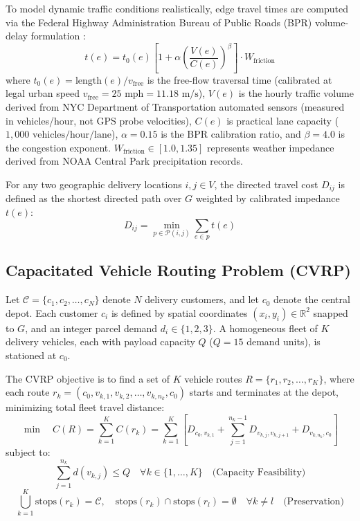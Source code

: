 \documentclass[journal,10pt]{IEEEtran}
\begin{document}
To model dynamic traffic conditions realistically, edge travel times are computed via the Federal Highway Administration Bureau of Public Roads (BPR) volume-delay formulation \cite{bpr1964traffic}:
\begin{equation}
\label{eq:bpr}
t(e) = t_0(e) \left[ 1 + \alpha \left(\frac{V(e)}{C(e)}\right)^\beta \right] \cdot W_{\text{friction}}
\end{equation}
where $t_0(e) = \text{length}(e) / v_{\text{free}}$ is the free-flow traversal time (calibrated at legal urban speed $v_{\text{free}} = 25\text{ mph} = 11.18\text{ m/s}$), $V(e)$ is the hourly traffic volume derived from NYC Department of Transportation automated sensors (measured in vehicles/hour, not GPS probe velocities), $C(e)$ is practical lane capacity ($1,000\text{ vehicles/hour/lane}$), $\alpha = 0.15$ is the BPR calibration ratio, and $\beta = 4.0$ is the congestion exponent. $W_{\text{friction}} \in [1.0, 1.35]$ represents weather impedance derived from NOAA Central Park precipitation records.

For any two geographic delivery locations $i, j \in V$, the directed travel cost $D_{ij}$ is defined as the shortest directed path over $G$ weighted by calibrated impedance $t(e)$:
\begin{equation}
D_{ij} = \min_{p \in \mathcal{P}(i, j)} \sum_{e \in p} t(e)
\end{equation}

\subsection{Capacitated Vehicle Routing Problem (CVRP)}
Let $\mathcal{C} = \{c_1, c_2, \dots, c_N\}$ denote $N$ delivery customers, and let $c_0$ denote the central depot. Each customer $c_i$ is defined by spatial coordinates $(x_i, y_i) \in \mathbb{R}^2$ snapped to $G$, and an integer parcel demand $d_i \in \{1, 2, 3\}$. A homogeneous fleet of $K$ delivery vehicles, each with payload capacity $Q$ ($Q = 15$ demand units), is stationed at $c_0$.

The CVRP objective is to find a set of $K$ vehicle routes $R = \{r_1, r_2, \dots, r_K\}$, where each route $r_k = (c_0, v_{k, 1}, v_{k, 2}, \dots, v_{k, n_k}, c_0)$ starts and terminates at the depot, minimizing total fleet travel distance:
\begin{equation}
\min \quad C(R) = \sum_{k=1}^K C(r_k) = \sum_{k=1}^K \left[ D_{c_0, v_{k, 1}} + \sum_{j=1}^{n_k - 1} D_{v_{k, j}, v_{k, j+1}} + D_{v_{k, n_k}, c_0} \right]
\end{equation}
subject to:
\begin{equation}
\sum_{j=1}^{n_k} d(v_{k, j}) \le Q \quad \forall k \in \{1, \dots, K\} \quad \text{(Capacity Feasibility)}
\end{equation}
\begin{equation}
\bigcup_{k=1}^K \text{stops}(r_k) = \mathcal{C}, \quad \text{stops}(r_k) \cap \text{stops}(r_l) = \emptyset \quad \forall k \ne l \quad \text{(Preservation)}
\end{equation}
\end{document}

